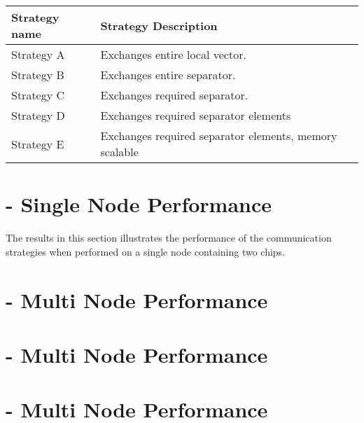 \begin{table}[H]
    \begin{center}
        \begin{tabular}[c]{|p{3cm}|p{9.5cm}|}
            \hline
             \textbf{Strategy name}& \textbf{Strategy Description}  \\
            \hline
             Strategy A&Exchanges entire local vector.  \\
            \hline
             Strategy B&Exchanges entire separator.  \\
            \hline
             Strategy C&Exchanges required separator.  \\
            \hline
             Strategy D&Exchanges required separator elements  \\
            \hline
             Strategy E&Exchanges required separator elements, memory scalable  \\
            \hline
        \end{tabular}
    \end{center}
    \label{tab:commstratdesc}
\end{table}

\section{ - Single Node Performance}
The results in this section illustrates the performance of the communication strategies when performed on a single node containing two \phantom{a}chips.  

\medskip

\section{ - Multi Node Performance}



\section{\romeq{} - Multi Node Performance}


\section{\fpgaq{} - Multi Node Performance}






